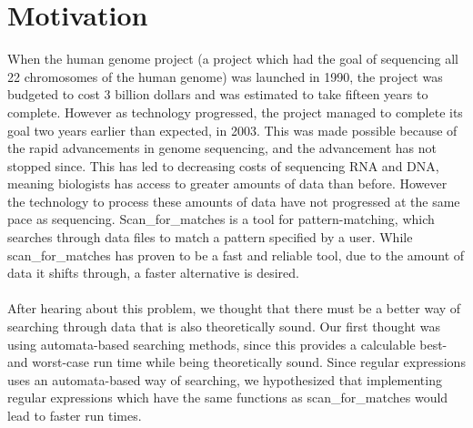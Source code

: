 \section{Motivation}
When the human genome project (a project which had the goal of sequencing 
all 22 chromosomes of the human genome) was launched in 1990, the project was 
budgeted to cost 3 billion dollars and was estimated to take fifteen years 
to complete. However as technology progressed, the project managed to complete 
its goal two years earlier than expected, in 2003. This was made possible 
because of the rapid advancements in genome sequencing, and the advancement 
has not stopped since. This has led to decreasing costs of sequencing RNA and DNA, 
meaning biologists has access to greater amounts of data than before. 
However the technology to process these amounts of data have not progressed at 
the same pace as sequencing. Scan\_for\_matches is a tool for pattern-matching, 
which searches through data files to match a pattern specified by a user. 
While scan\_for\_matches has proven to be a fast and reliable 
tool, due to the amount of data it shifts through, a faster alternative 
is desired.\\\\
After hearing about this problem, we thought that there must be a better 
way of searching through data that is also theoretically sound. Our first 
thought was using automata-based searching methods, since this provides a 
calculable best- and worst-case run time while being theoretically sound. 
Since regular expressions uses an automata-based way of searching, we hypothesized 
that implementing regular expressions which have the same functions as 
scan\_for\_matches would lead to faster run times.
